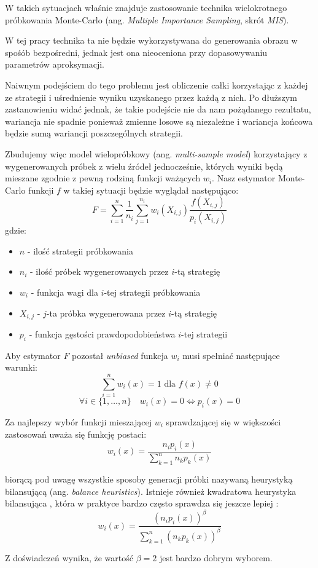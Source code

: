 \documentclass[../main.tex]{subfiles}
\begin{document}
W takich sytuacjach właśnie znajduje zastosowanie technika wielokrotnego próbkowania Monte-Carlo (ang. \textit{Multiple Importance Sampling}, skrót \textit{MIS}).

W tej pracy technika ta nie będzie wykorzystywana do generowania obrazu w spośób bezpośredni, jednak jest ona nieoceniona przy dopasowywaniu parametrów aproksymacji.

Naiwnym podejściem do tego problemu jest obliczenie całki korzystając z każdej ze strategii i uśrednienie wyniku uzyskanego przez każdą z nich. Po dłuższym zastanowieniu widać jednak, że takie podejście nie da nam pożądanego rezultatu, wariancja nie spadnie ponieważ zmienne losowe są niezależne i wariancja końcowa będzie sumą wariancji poszczególnych strategii.

Zbudujemy więc model wielopróbkowy (ang. \textit{multi-sample model}) \cite{pbrt,ImportanceSamplingForProduction} korzystający z wygenerowanych próbek z wielu źródeł jednocześnie, których wyniki będą mieszane zgodnie z pewną rodziną funkcji ważących $w_i$. Nasz estymator Monte-Carlo funkcji $f$ w takiej sytuacji będzie wyglądał następująco:
\[
  F = \sum_{i=1}^{n} \frac{1}{n_i} \sum_{j=1}^{n_i} w_{i}(X_{i,j}) \frac{
    f(X_{i,j})
  }{
    p_{i}(X_{i,j})
  }
\]
\noindent gdzie:
\begin{itemize}
	\item $n$ - ilość strategii próbkowania
	\item $n_i$ - ilość próbek wygenerowanych przez $i$-tą strategię
	\item $w_i$ - funkcja wagi dla $i$-tej strategii próbkowania
	\item $X_{i,j}$ - $j$-ta próbka wygenerowana przez $i$-tą strategię
	\item $p_i$ - funkcja gęstości prawdopodobieństwa $i$-tej strategii
\end{itemize}

Aby estymator $F$ pozostał \textit{unbiased} funkcja $w_i$ musi spełniać następujące warunki:
\[ \sum_{i = 1}^{n} w_{i}(x) = 1 \text{ dla } f(x) \neq 0 \]
\[
  \forall i \in \{ 1, \ldots, n \} \quad
  w_{i}(x) = 0 \Leftrightarrow p_i(x) = 0
\]

Za najlepszy wybór funkcji mieszającej $w_i$ sprawdzającej się w większości zastosowań uważa się funkcję postaci:
\[
  w_{i}(x) = \frac{
    n_{i} p_{i}(x)
  }{
    \sum_{k=1}^{n} {
      n_{k} p_{k}(x)
    }
  }
\]

\noindent biorącą pod uwagę wszystkie sposoby generacji próbki nazywaną heurystyką bilansującą (ang. \textit{balance heuristics}). Istnieje również kwadratowa heurystyka bilansująca \cite{pbrt}, która w praktyce bardzo często sprawdza się jeszcze lepiej \cite{pbrt,Veach}:
\[
  w_{i}(x) = 
  \frac{
	\left( n_{i} p_{i}(x) \right)^{\beta}
  }{
	\sum_{k=1}^{n} {
		\left(n_{k} p_{k}(x)\right)^{\beta}
	}
  }
\]

Z doświadczeń \cite{Veach} wynika, że wartość $\beta = 2$ jest bardzo dobrym wyborem.
\end{document}
